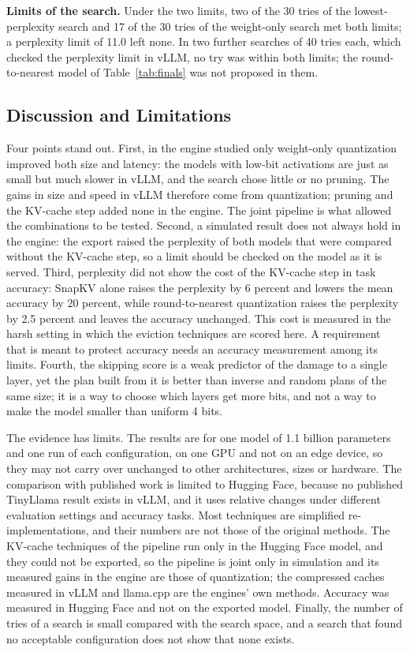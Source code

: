 \documentclass[num-refs]{wiley-article}
\begin{document}
\textbf{Limits of the search.} Under the two limits, two of the 30 tries of the lowest-perplexity search and 17 of the 30 tries of the weight-only search met both limits; a perplexity limit of 11.0 left none. In two further searches of 40 tries each, which checked the perplexity limit in vLLM, no try was within both limits; the round-to-nearest model of Table~\ref{tab:finals} was not proposed in them.

\subsection{Discussion and Limitations}

Four points stand out. First, in the engine studied only weight-only quantization improved both size and latency: the models with low-bit activations are just as small but much slower in vLLM, and the search chose little or no pruning. The gains in size and speed in vLLM therefore come from quantization; pruning and the KV-cache step added none in the engine. The joint pipeline is what allowed the combinations to be tested. Second, a simulated result does not always hold in the engine: the export raised the perplexity of both models that were compared without the KV-cache step, so a limit should be checked on the model as it is served. Third, perplexity did not show the cost of the KV-cache step in task accuracy: SnapKV alone raises the perplexity by 6 percent and lowers the mean accuracy by 20 percent, while round-to-nearest quantization raises the perplexity by 2.5 percent and leaves the accuracy unchanged. This cost is measured in the harsh setting in which the eviction techniques are scored here. A requirement that is meant to protect accuracy needs an accuracy measurement among its limits. Fourth, the skipping score is a weak predictor of the damage to a single layer, yet the plan built from it is better than inverse and random plans of the same size; it is a way to choose which layers get more bits, and not a way to make the model smaller than uniform 4 bits.

The evidence has limits. The results are for one model of 1.1 billion parameters and one run of each configuration, on one GPU and not on an edge device, so they may not carry over unchanged to other architectures, sizes or hardware. The comparison with published work is limited to Hugging Face, because no published TinyLlama result exists in vLLM, and it uses relative changes under different evaluation settings and accuracy tasks. Most techniques are simplified re-implementations, and their numbers are not those of the original methods. The KV-cache techniques of the pipeline run only in the Hugging Face model, and they could not be exported, so the pipeline is joint only in simulation and its measured gains in the engine are those of quantization; the compressed caches measured in vLLM and llama.cpp are the engines' own methods. Accuracy was measured in Hugging Face and not on the exported model. Finally, the number of tries of a search is small compared with the search space, and a search that found no acceptable configuration does not show that none exists.
\end{document}

